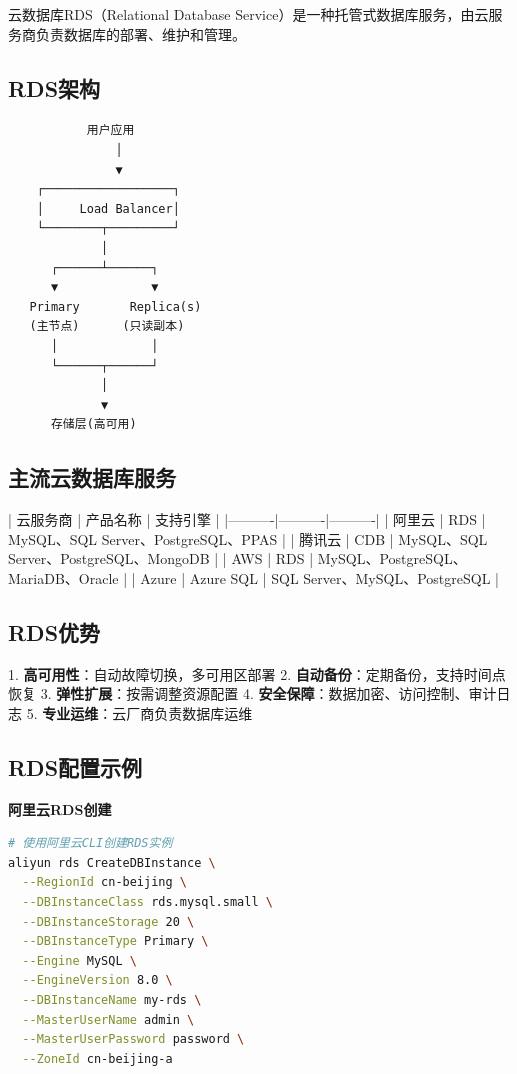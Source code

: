 \documentclass[12pt,UTF8]{ctexbook}
\begin{document}
云数据库RDS（Relational Database Service）是一种托管式数据库服务，由云服务商负责数据库的部署、维护和管理。

\subsection*{RDS架构}

\begin{lstlisting}
           用户应用
               │
               ▼
    ┌──────────────────┐
    │     Load Balancer│
    └────────┬─────────┘
             │
      ┌──────┴──────┐
      ▼             ▼
   Primary       Replica(s)
   (主节点)      (只读副本)
      │             │
      └──────┬──────┘
             │
             ▼
      存储层(高可用)
\end{lstlisting}

\subsection*{主流云数据库服务}

| 云服务商 | 产品名称 | 支持引擎 |
|----------|----------|----------|
| 阿里云 | RDS | MySQL、SQL Server、PostgreSQL、PPAS |
| 腾讯云 | CDB | MySQL、SQL Server、PostgreSQL、MongoDB |
| AWS | RDS | MySQL、PostgreSQL、MariaDB、Oracle |
| Azure | Azure SQL | SQL Server、MySQL、PostgreSQL |

\subsection*{RDS优势}

1. \textbf{高可用性}：自动故障切换，多可用区部署
2. \textbf{自动备份}：定期备份，支持时间点恢复
3. \textbf{弹性扩展}：按需调整资源配置
4. \textbf{安全保障}：数据加密、访问控制、审计日志
5. \textbf{专业运维}：云厂商负责数据库运维

\subsection*{RDS配置示例}

\textbf{阿里云RDS创建}
\begin{lstlisting}[language=bash]
# 使用阿里云CLI创建RDS实例
aliyun rds CreateDBInstance \
  --RegionId cn-beijing \
  --DBInstanceClass rds.mysql.small \
  --DBInstanceStorage 20 \
  --DBInstanceType Primary \
  --Engine MySQL \
  --EngineVersion 8.0 \
  --DBInstanceName my-rds \
  --MasterUserName admin \
  --MasterUserPassword password \
  --ZoneId cn-beijing-a
\end{lstlisting}
\end{document}
